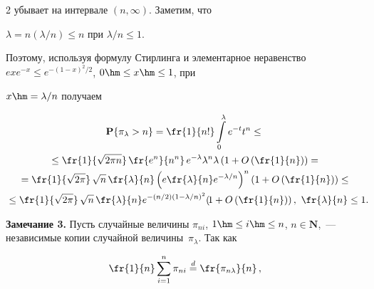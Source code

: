 \begin{multicols}{2}
убывает на интервале  $(n, \infty)$. Заметим, что


$\lambda=n({\lambda}/{n})\le n$ при ${\lambda}/{n}\le 1$.


Поэтому, используя формулу Стирлинга и элементарное неравенство $e x


e^{-x}\le e^{-{(1-x)^2}/{2}}$, $0\hm\le x\hm\le 1$, при


$x\hm={\lambda}/{n}$ по\-лу\-чаем


\begin{multline*}


\mathbf{P}\{\pi_{\lambda}>n\}=\fr{1}{n!}\int\limits_0^{\lambda}e^{-t}t^n\le{}\\


{}\le\fr{1}{\sqrt{2\pi


n}}\,\fr{e^n}{n^n}\,e^{-\lambda}\lambda^n\lambda\left(1+O\left(\fr{1}{n}\right)\right)={}\\


{}=\fr{1}{\sqrt{2\pi}}\,\sqrt{n}\,\fr{\lambda}{n}\left(e\fr{\lambda}{n}e^{-{\lambda}/{n}}\right)^n


\left(1+O\left(\fr{1}{n}\right)\right)


\le{}\\


{}\le \fr{1}{\sqrt{2\pi}}\, \sqrt{n}\,\fr{\lambda}{n}e^{-({n}/{2})\left(1-{\lambda}/{n}\right)^2}


\!\left(\!1+O\left(\fr{1}{n}\right)\right),\


\fr{\lambda}{n}\le 1.\hspace*{-4.80296pt}


\end{multline*}








\smallskip





\noindent


\textbf{Замечание 3.} Пусть случайные величины $\pi_{ni}$, $1\hm\le i\hm\le


n$, $n\in\mathbf{N}$,~--- независимые копии случайной величины~$\pi_{\lambda}$. Так как


\begin{equation}


\fr{1}{n}\sum_{i=1}^n\pi_{ni}\stackrel{d}{=}\fr{\pi_{n\lambda}}{n}\,,


\label{e13-chu}


\end{equation}



\end{multicols}
